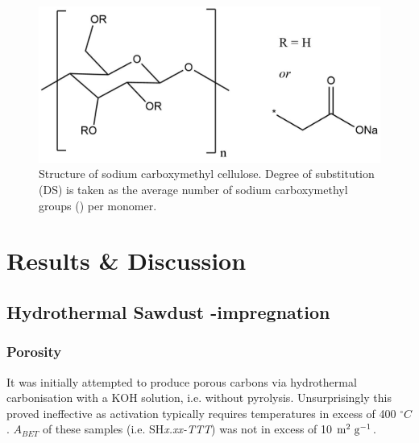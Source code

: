 \begin{figure}[h]
    \centering
    \includegraphics[width=0.8\columnwidth]{4-impregnation/figs/nc_structure.png}
    \caption{Structure of sodium carboxymethyl cellulose. Degree of substitution (DS) is taken as the average number of sodium carboxymethyl groups () per monomer.}
    \label{fig:nc_structure}
\end{figure}

\section{Results \& Discussion}
\subsection{\texorpdfstring{Hydrothermal Sawdust -impregnation}{Hydrothermal Sawdust KOH-impregnation}}

\subsubsection{Porosity}

It was initially attempted to produce porous carbons via hydrothermal carbonisation with a KOH solution, i.e. without pyrolysis. Unsurprisingly this proved ineffective as activation typically requires temperatures in excess of 400 $^{\circ}C$. $A_{BET}$ of these samples (i.e. SH\textit{x.xx-TTT}) was not in excess of 10 $\rm m^2\ g^{-1}$.

